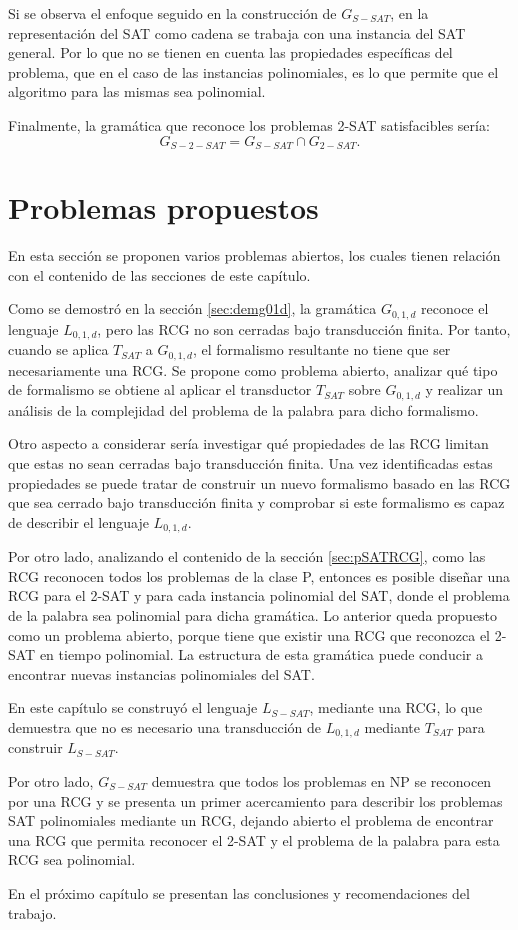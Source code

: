 Si se observa el enfoque seguido en la construcción de $G_{S-SAT}$, en la representación del SAT como cadena se trabaja con una instancia del SAT general. Por lo que no se tienen en cuenta las propiedades específicas del problema, que en el caso de las instancias polinomiales, es lo que permite que el algoritmo para las mismas sea polinomial.

Finalmente, la gramática que reconoce los problemas 2-SAT satisfacibles sería:
$$G_{S-2-SAT}=G_{S-SAT}\cap G_{2-SAT}.$$

\section{Problemas propuestos}


En esta sección se proponen varios problemas abiertos, los cuales tienen relación con el contenido de las secciones
de este capítulo.

Como se demostró en la sección \ref{sec:demg01d}, la gramática $G_{0,1,d}$ reconoce el lenguaje $L_{0,1,d}$, pero las RCG no son cerradas bajo transducción finita. Por tanto, cuando se aplica $T_{SAT}$ a $G_{0,1,d}$, el formalismo resultante no tiene que ser necesariamente una RCG. Se propone como problema abierto, analizar qué tipo de formalismo se obtiene al aplicar el transductor $T_{SAT}$ sobre $G_{0,1,d}$ y realizar un análisis de la complejidad del problema de la palabra para dicho formalismo.

Otro aspecto a considerar sería investigar qué propiedades de las RCG limitan que estas no sean cerradas bajo transducción finita.  Una vez identificadas estas propiedades se puede tratar de construir un nuevo formalismo basado en las RCG que sea cerrado bajo transducción finita y comprobar si este formalismo es capaz de describir el lenguaje $L_{0,1,d}$.

Por otro lado, analizando el contenido de la sección \ref{sec:pSATRCG}, como las RCG reconocen todos los problemas de la clase P, entonces es posible diseñar una RCG para el 2-SAT y para cada instancia polinomial del SAT, donde el problema de la palabra sea polinomial para dicha gramática.  Lo anterior queda propuesto como un problema abierto, porque tiene que existir una RCG que reconozca el 2-SAT en tiempo polinomial. La estructura de esta gramática puede conducir a encontrar nuevas instancias polinomiales del SAT.

En este capítulo se construyó el lenguaje $L_{S-SAT}$, mediante una RCG, lo que demuestra que no es necesario una transducción de $L_{0,1,d}$ mediante $T_{SAT}$ para construir $L_{S-SAT}$.

Por otro lado, $G_{S-SAT}$ demuestra que todos los problemas en NP se reconocen por una RCG y se presenta un primer acercamiento para describir los problemas SAT polinomiales mediante un RCG, dejando abierto el problema de encontrar una RCG que permita reconocer el 2-SAT y el problema de la palabra para esta RCG sea polinomial.

En el próximo capítulo se presentan las conclusiones y recomendaciones del trabajo.
